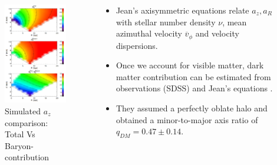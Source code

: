 \documentclass[xcolor=dvipsnames]{beamer}
\begin{document}
\begin{frame}

\begin{columns}[c]

\begin{column}{.5\textwidth}
\begin{figure}
\includegraphics[width=0.8\linewidth]{./pics/loebmanAccelerationCurves.png}
\caption{\tiny Simulated $a_z$ comparison: Total Vs Baryon-contribution}
\end{figure}
\end{column}

\begin{column}{.6\textwidth}
\centering
\small
\begin{itemize}

\item Jean's axisymmetric equations relate $a_z , a_R$ with stellar number density $\nu$, mean azimuthal velocity $\overline{v}_{\phi}$ and velocity dispersions.

\item Once we account for visible matter, dark matter contribution can be estimated from observations (SDSS) and Jean's equations \cite[van der Marel 1991]{vanDerMarel1991}.

\item They assumed a perfectly oblate halo and obtained a minor-to-major axis ratio of $q_{DM} = 0.47 \pm 0.14$.

\end{itemize}

\end{column}

\end{columns}

\end{frame}
\end{document}
